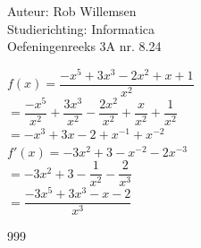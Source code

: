 \documentclass[a4paper]{article}
\begin{document}
\noindent \large Auteur: Rob Willemsen \\
\noindent \large Studierichting: Informatica\\
\noindent \large Oefeningenreeks 3A nr. 8.24\\

\medskip

\normalsize

$f(x) = \dfrac{-x^5 + 3x^3 - 2x^2 + x + 1}{x^2}$ \\

$= \dfrac{-x^5}{x^2} + \dfrac{3x^3}{x^2} - \dfrac{2x^2}{x^2} + \dfrac{x}{x^2} + \dfrac{1}{x^2}$ \\

$= -x^3 + 3x - 2 + x^{-1} + x^{-2}$ \\

$f'(x) = -3x^2 + 3 - x^{-2} - 2x^{-3}$ \\

$= -3x^2 + 3 - \dfrac{1}{x^2} - \dfrac{2}{x^3}$ \\

$= \dfrac{-3x^5 + 3x^3 - x - 2}{x^3}$ \\

\begin{thebibliography}{999}
\end{thebibliography}
\end{document}
